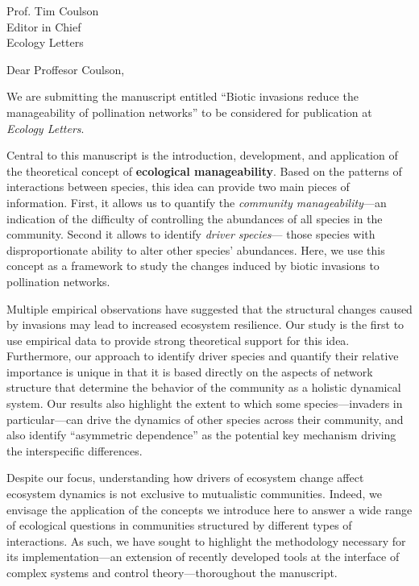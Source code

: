 \documentclass[10pt, a4paper]{letter}
\begin{document}
\begin{letter}{
       Prof. Tim Coulson\\
       Editor in Chief\\
       Ecology Letters}

\opening{Dear Proffesor Coulson,}

We are submitting the manuscript entitled ``Biotic invasions reduce the manageability of pollination networks'' to be considered for publication at \emph{Ecology Letters}. 

Central to this manuscript is the introduction, development, and application
of the theoretical concept of \textbf{ecological manageability}. Based on the
patterns of interactions between species, this idea can provide two main
pieces of information. First, it allows us to quantify the \textit{community
manageability}---an indication of the difficulty of controlling the abundances
of all species in the community. Second it allows to identify \textit{driver
species}--- those species with disproportionate ability to alter other
species' abundances. Here, we use this concept as a framework to study the
changes induced by biotic invasions to pollination networks.

Multiple empirical observations have suggested that the structural changes
caused by invasions may lead to increased ecosystem resilience. Our study is
the first to use empirical data to provide strong theoretical support for this
idea. Furthermore, our approach to identify driver species and quantify their
relative importance is unique in that it is based directly on the aspects of
network structure that determine the behavior of the community as a holistic
dynamical system. Our results also highlight the extent to which some
species---invaders in particular---can drive the dynamics of other species
across their community, and also identify ``asymmetric dependence'' as the
potential key mechanism driving the interspecific differences.

Despite our focus, understanding how drivers of ecosystem change affect
ecosystem dynamics is not exclusive to mutualistic communities. Indeed, we
envisage the application of the concepts we introduce here to answer a wide
range of ecological questions in communities structured by different types of
interactions. As such, we have sought to highlight the methodology necessary
for its implementation---an extension of recently developed tools at the
interface of complex systems and control theory---thoroughout the manuscript.


\end{letter}
\end{document}
